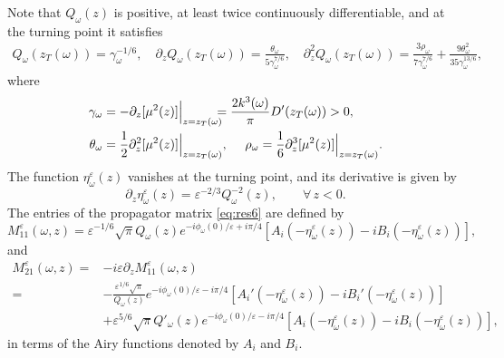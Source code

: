 \documentclass[final]{siamltex}
\begin{document}
Note that $Q_{\omega}(z)$ is positive, at least twice continuously
differentiable, and at the turning point it satisfies
\begin{align}
Q_{\omega}(z_T({\omega})) = \gamma_{\omega}^{-1/6}, \label{eq:res10} \quad
\partial_zQ_{\omega}(z_T({\omega})) = \frac{\theta_{\omega}}{5\gamma_{\omega}^{7/6} }, \quad 
\partial_z^2 Q_{\omega}(z_T({\omega})) = 
\frac{3 \rho_{\omega}}{7 \gamma_{\omega}^{7/6}} +
\frac{9 \theta_{\omega}^2}{35 \gamma_{\omega}^{13/6}},
\end{align}
where 
\begin{align}
\gamma_{\omega} & = - \partial_z [\mu^2(z)]\Big|_{z=z_T({\omega})} \hspace{-0.1in}=  \frac{2
  k^3({\omega})}{\pi} D'(z_T({\omega})) > 0, 
\label{eq:res13}\\
\theta_{\omega} &= \frac{1}{2} \partial_z^2 [\mu^2(z)]\Big|_{z=z_T({\omega})}, ~~~~
\rho_{\omega} = \frac{1}{6} \partial_z^3 [\mu^2(z)]\Big|_{z=z_T({\omega})} .
\end{align}
The function $\eta_{\omega}^{\varepsilon}(z)$ vanishes at the turning point, and its derivative
is given by
\begin{equation}
\partial_z \eta_{\omega}^{\varepsilon}(z) = {\varepsilon}^{-2/3} Q^{-2}_{\omega}(z), \qquad
\forall\, z < 0.
\label{eq:res14}
\end{equation}
The entries of the propagator matrix \eqref{eq:res6} are defined by
\begin{equation}
M_{11}^{\varepsilon}({\omega},z) = {\varepsilon}^{-1/6}\sqrt{\pi} Q_{\omega}(z) e^{-i\phi_{\omega}(0)/{\varepsilon} + i \pi/4} 
\left[A_i(-\eta_{\omega}^{\varepsilon}(z)) - i B_i(-\eta_{\omega}^{\varepsilon}(z))\right],
\label{eq:res15}
\end{equation}
and
\begin{align}
M_{21}^{\varepsilon}({\omega},z) =& - i {\varepsilon} \partial_z M_{11}^{\varepsilon}({\omega},z) \nonumber
\\=& - \frac{{\varepsilon}^{1/6} \sqrt{\pi}}{Q_{\omega}(z)} e^{-i\phi_{\omega}(0)/{\varepsilon} - i
  \pi/4} \left[ A_i'(-\eta_{\omega}^{\varepsilon}(z)) - i
  B_i'(-\eta_{\omega}^{\varepsilon}(z))\right] \nonumber \\ &+ {\varepsilon}^{5/6} \sqrt{\pi}
Q'_{\omega}(z) e^{-i\phi_{\omega}(0)/{\varepsilon} - i \pi/4} \left[ A_i(-\eta_{\omega}^{\varepsilon}(z))
  - i B_i(-\eta_{\omega}^{\varepsilon}(z))\right],
\label{eq:res16}
\end{align}
in terms of the Airy functions \cite[chapter
  10]{abramowitz1972handbook} denoted by $A_i$ and $B_i$. 
\end{document}
